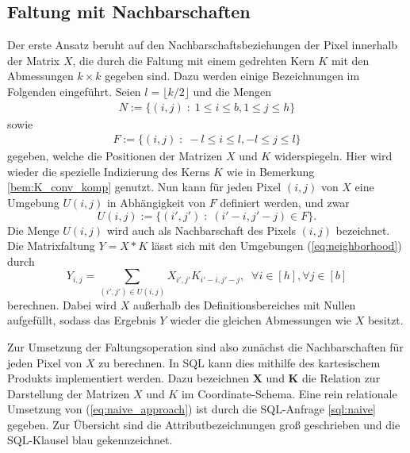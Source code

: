 \subsection{Faltung mit Nachbarschaften}
\label{abs:naive_app}
Der erste Ansatz beruht auf den Nachbarschaftsbeziehungen der Pixel innerhalb der Matrix $X$, die durch die Faltung mit einem gedrehten Kern $K$ mit den Abmessungen $k \times k$ gegeben sind. Dazu werden einige Bezeichnungen im Folgenden eingeführt. Seien $l=\lfloor k/2 \rfloor$ und die Mengen
\begin{align*}
    N:=\{(i,j) \; :\; 1 \leq i \leq b, 1 \leq j \leq h \}
\end{align*} 
sowie
\begin{align*}
    F:=\{(i,j) \; :\; -l \leq i \leq l, -l \leq j \leq l \}
\end{align*} 
gegeben, welche die Positionen der Matrizen $X$ und $K$ widerspiegeln. Hier wird wieder die spezielle Indizierung des Kerns $K$ wie in Bemerkung \ref{bem:K_conv_komp} genutzt. Nun kann für jeden Pixel $(i,j)$ von $X$ eine Umgebung $U(i,j)$  in Abhängigkeit von $F$ definiert werden, und zwar
\begin{equation}
    \label{eq:neighborhood}
    U(i,j):=\{(i', j') \; : \; (i'-i, j'-j) \in F \}.
\end{equation}
Die Menge $U(i,j)$ wird auch als Nachbarschaft des Pixels $(i,j)$ bezeichnet.
Die Matrixfaltung $Y= X \ast K$ lässt sich mit den Umgebungen (\ref{eq:neighborhood}) durch
\begin{equation}
    \label{eq:naive_approach}
    Y_{i,j}=\sum_{(i',j') \in U(i,j)} X_{i', j'} K_{i'-i, j'-j}, \; \; \forall i \in [h], \forall j \in [b]
\end{equation}
berechnen. Dabei wird $X$ außerhalb des Definitionsbereiches mit Nullen aufgefüllt, sodass das Ergebnis $Y$ wieder die gleichen Abmessungen wie $X$ besitzt.

Zur Umsetzung der Faltungsoperation sind also zunächst die Nachbarschaften für jeden Pixel von $X$ zu berechnen. In SQL kann dies mithilfe des kartesischem Produkts implementiert werden. Dazu bezeichnen $\mathbf{X}$ und $\mathbf{K}$ die Relation zur Darstellung der Matrizen $X$ und $K$ im Coordinate-Schema. Eine rein relationale Umsetzung von (\ref{eq:naive_approach}) ist durch die SQL-Anfrage \ref{sql:naive} gegeben. Zur Übersicht sind die Attributbezeichnungen groß geschrieben und die SQL-Klausel blau gekennzeichnet. 



